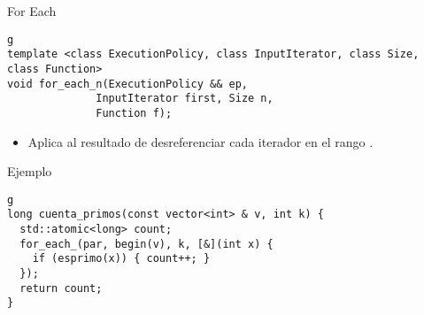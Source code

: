 \begin{frame}[t,fragile]{For Each}
\begin{lstlisting}g
template <class ExecutionPolicy, class InputIterator, class Size, class Function>
void for_each_n(ExecutionPolicy && ep, 
              InputIterator first, Size n,
              Function f);
\end{lstlisting}
\begin{itemize}
  \item Aplica  al resultado de desreferenciar cada iterador en el rango \cppid{[first, first+n)}.
\end{itemize}
\begin{block}{Ejemplo}
\begin{lstlisting}g
long cuenta_primos(const vector<int> & v, int k) {
  std::atomic<long> count;
  for_each_(par, begin(v), k, [&](int x) {
    if (esprimo(x)) { count++; }
  });
  return count;
}
\end{lstlisting}
\end{block}
\end{frame}
